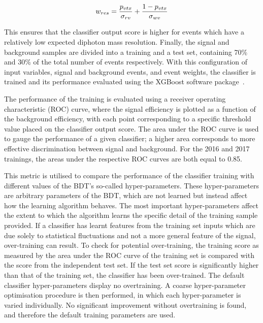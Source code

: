 \begin{equation}
  w_{res} = \frac{p_{vtx}}{\sigma_{rv}} + \frac{1-p_{vtx}}{\sigma_{wv}}
\end{equation}

This ensures that the classifier output score is higher for events 
which have a relatively low expected diphoton mass resolution.
Finally, the signal and background samples are divided into a training and a test set,
containing 70\% and 30\% of the total number of events respectively.
With this configuration of input variables, signal and background events, and event weights, 
the classifier is trained and its performance evaluated using the XGBoost software package~\cite{XGBoost}.

The performance of the training is evaluated using a receiver operating characteristic (ROC) curve, 
where the signal efficiency is plotted as a function of the background efficiency,
with each point corresponding to a specific threshold value placed on the classifier output score.
The area under the ROC curve is used to gauge the performance of a given classifier; 
a higher area corresponds to more effective discrimination between signal and background.
For the 2016 and 2017 trainings, the areas under the respective ROC curves are both equal to 0.85.

This metric is utilised to compare the performance of the classifier training 
with different values of the BDT's so-called hyper-parameters.
These hyper-parameters are arbitrary parameters of the BDT, 
which are not learned but instead affect how the learning algorithm behaves.
The most important hyper-parameters affect the extent to which 
the algorithm learns the specific detail of the training sample provided.
If a classifier has learnt features from the training set inputs
which are due solely to statistical fluctuations and not a more general feature of the signal, 
over-training can result.
To check for potential over-training, the training score as measured by the area under the ROC curve 
of the training set is compared with the score from the independent test set.
If the test set score is significantly higher than that of the training set, 
the classifier has been over-trained.
The default classifier hyper-parameters display no overtraining.
A coarse hyper-parameter optimisation procedure is then performed, 
in which each hyper-parameter is varied individually.
No significant improvement without overtraining is found, 
and therefore the default training parameters are used.


